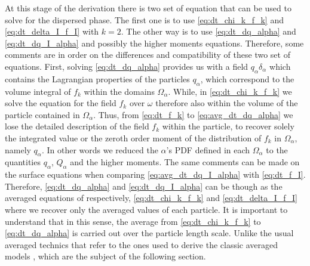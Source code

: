 At this stage of the derivation there is two set of equation that can be used to solve for the dispersed phase. 
The first one is to use \ref{eq:dt_chi_k_f_k} and \ref{eq:dt_delta_I_f_I} with $k =2$.
The other way is to use \ref{eq:dt_dq_alpha} and \ref{eq:dt_dq_I_alpha} and possibly the higher moments equations.
Therefore, some comments are in order on the differences and compatibility of these two set of equations.
First, solving \ref{eq:dt_dq_alpha} provides us with a field $q_\alpha\delta_\alpha$ which contains the Lagrangian properties of the particles $q_\alpha$, which correspond to the volume integral of $f_k$ within the domains $\Omega_\alpha$.
While, in \ref{eq:dt_chi_k_f_k} we solve the equation for the field $f_k$ over $\omega$ therefore also within the volume of the particle contained in $\Omega_\alpha$.
Thus, from  \ref{eq:dt_f_k} to \ref{eq:avg_dt_dq_alpha} we lose the detailed description of the field $f_k$ within the particle, to recover solely the integrated value or the zeroth order moment of the distribution of $f_k$ in $\Omega_\alpha$, namely $q_\alpha$. 
In other words we reduced the $\alpha$'s PDF defined in each $\Omega_\alpha$ to the quantities $q_\alpha$, $Q_\alpha$ and the higher moments.  
The same comments can be made on the surface equations when comparing \ref{eq:avg_dt_dq_I_alpha} with \ref{eq:dt_f_I}. 
Therefore, \ref{eq:dt_dq_alpha} and \ref{eq:dt_dq_I_alpha} can be though as the averaged equations of respectively, \ref{eq:dt_chi_k_f_k} and  \ref{eq:dt_delta_I_f_I} where we recover only the averaged values of each particle. 
It is important to understand that in this sense, the average from \ref{eq:dt_chi_k_f_k} to \ref{eq:dt_dq_alpha} is carried out over the particle length scale.
Unlike the usual averaged technics that refer to the ones used to derive the classic averaged models \citep{jackson1997locally,zhang1994averaged}, which are the subject of the following section. 


